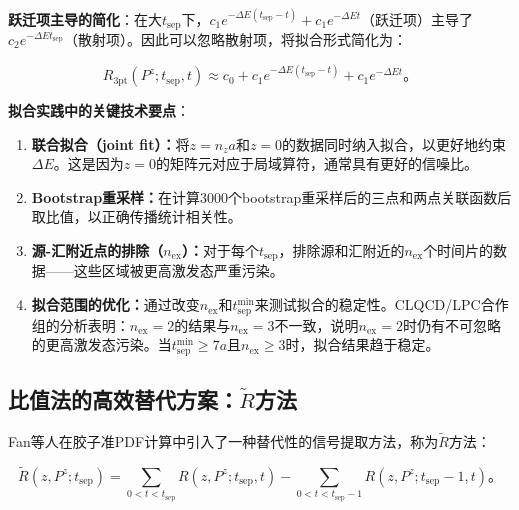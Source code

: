 \documentclass[12pt,a4paper]{ctexart}
\theoremstyle{definition}
\begin{document}
\textbf{跃迁项主导的简化}\cite{Chen2025gluon}：在大$t_{\text{sep}}$下，$c_1 e^{-\Delta E(t_{\text{sep}}-t)} + c_1 e^{-\Delta E t}$（跃迁项）主导了$c_2 e^{-\Delta E t_{\text{sep}}}$（散射项）。因此可以忽略散射项，将拟合形式简化为：

\begin{equation}
\boxed{R_{\text{3pt}}(P^z; t_{\text{sep}}, t) \approx c_0 + c_1 e^{-\Delta E(t_{\text{sep}}-t)} + c_1 e^{-\Delta E t}}。
\label{eq:two_state_fit_simple}
\end{equation}

\textbf{拟合实践中的关键技术要点}\cite{Chen2025gluon}：

\begin{enumerate}
    \item \textbf{联合拟合（joint fit）：}将$z = n_z a$和$z = 0$的数据同时纳入拟合，以更好地约束$\Delta E$。这是因为$z = 0$的矩阵元对应于局域算符，通常具有更好的信噪比。

    \item \textbf{Bootstrap重采样：}在计算3000个bootstrap重采样后的三点和两点关联函数后取比值，以正确传播统计相关性。

    \item \textbf{源-汇附近点的排除（$n_{\text{ex}}$）：}对于每个$t_{\text{sep}}$，排除源和汇附近的$n_{\text{ex}}$个时间片的数据——这些区域被更高激发态严重污染。

    \item \textbf{拟合范围的优化：}通过改变$n_{\text{ex}}$和$t_{\text{sep}}^{\text{min}}$来测试拟合的稳定性。CLQCD/LPC合作组的分析表明\cite{Chen2025gluon}：$n_{\text{ex}} = 2$的结果与$n_{\text{ex}} = 3$不一致，说明$n_{\text{ex}} = 2$时仍有不可忽略的更高激发态污染。当$t_{\text{sep}}^{\text{min}} \geq 7a$且$n_{\text{ex}} \geq 3$时，拟合结果趋于稳定。
\end{enumerate}

\subsection{比值法的高效替代方案：$\tilde{R}$方法}

Fan等人在胶子准PDF计算中引入了一种替代性的信号提取方法\cite{Fan2018gluon}，称为$\tilde{R}$方法：

\begin{equation}
\tilde{R}(z, P^z; t_{\text{sep}}) = \sum_{0 < t < t_{\text{sep}}} R(z, P^z; t_{\text{sep}}, t) - \sum_{0 < t < t_{\text{sep}}-1} R(z, P^z; t_{\text{sep}}-1, t)。
\label{eq:Rtilde_method}
\end{equation}
\end{document}
